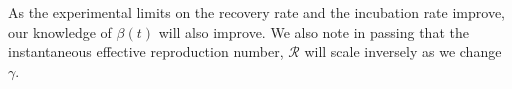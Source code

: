 \documentclass[aps,prd,10pt,twocolumn,nofootinbib]{revtex4-2}
\begin{document}
As the experimental limits on the recovery rate and the incubation rate improve, our knowledge of $\beta(t)$ will also improve.
We also note in passing that the instantaneous effective reproduction number, $\mathscr{R}$ will scale inversely as we change $\gamma$.


%
%
\end{document}
